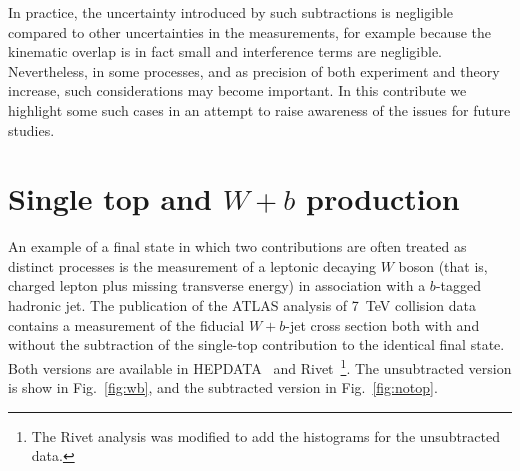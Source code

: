 \documentclass[11pt]{cernrep}
\begin{document}
In practice, the uncertainty introduced by such subtractions is negligible compared to other uncertainties in the measurements, 
for example because the kinematic overlap
is in fact small and interference terms are negligible. Nevertheless, in some processes, and as precision of both experiment
and theory increase, such considerations may become important. In this contribute we highlight some such cases in an attempt 
to raise awareness of the issues for future studies. 

\section{Single top and $W+b$ production}

An example of a final state in which two contributions are often treated as distinct processes is the measurement of a leptonic
decaying $W$ boson (that is, charged lepton plus missing transverse energy) in association with a $b$-tagged hadronic jet. 
The publication of the ATLAS analysis of 7~TeV collision data\cite{Aad:2013vka} contains a measurement of the fiducial $W+b$-jet 
cross section both with and without the subtraction of the single-top contribution to the identical final state. Both
versions are available in HEPDATA~\cite{} and Rivet~\cite{Buckley:2010ar}\footnote{The Rivet analysis was modified to add the histograms for the unsubtracted data.}. 
The unsubtracted version is show in Fig.~\ref{fig:wb}, and the subtracted version in Fig.~\ref{fig:notop}. 
\end{document}
